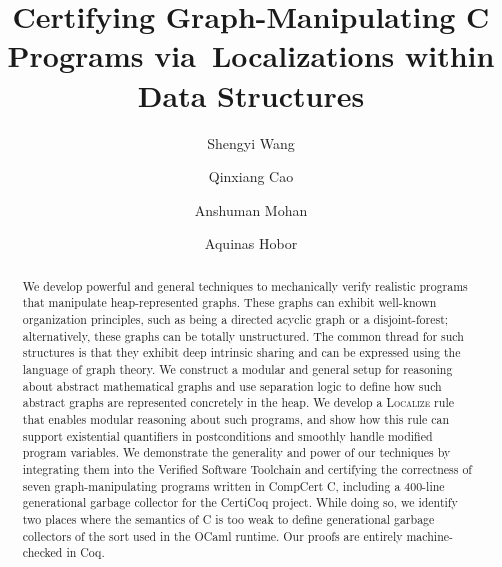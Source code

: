 \documentclass[acmsmall,screen]{acmart}
\newcommand\hide[1]{}
\newcommand{\infrulestyle}[1]{\textsc{#1}}
\begin{document}
\title[Certifying Graph-Manipulating Programs]
{Certifying Graph-Manipulating C Programs via~Localizations within Data Structures}





\author[S. Wang]{Shengyi Wang}


\author[Q. Cao]{Qinxiang Cao}


\author[A. Mohan]{Anshuman Mohan}


\author[A. Hobor]{Aquinas Hobor}



\hide{
\author{First2 Last2}
\authornote{with author2 note}          \orcid{nnnn-nnnn-nnnn-nnnn}             \affiliation{
  \position{Position2a}
  \department{Department2a}             \institution{Institution2a}           \streetaddress{Street2a Address2a}
  \city{City2a}
  \state{State2a}
  \postcode{Post-Code2a}
  \country{Country2a}                   }
\email{first2.last2@inst2a.com}         \affiliation{
  \position{Position2b}
  \department{Department2b}             \institution{Institution2b}           \streetaddress{Street3b Address2b}
  \city{City2b}
  \state{State2b}
  \postcode{Post-Code2b}
  \country{Country2b}                   }
\email{first2.last2@inst2b.org}         } 

\begin{abstract}
We develop powerful and general techniques to mechanically verify realistic programs that
manipulate heap-represented graphs.  These graphs can exhibit well-known organization 
principles, such as being a directed acyclic graph or a disjoint-forest; alternatively, these graphs can 
be totally unstructured.  The common thread for such structures is that they exhibit deep 
intrinsic sharing and can be expressed using the language of graph theory. 
We construct a modular and general setup for reasoning about abstract mathematical
graphs and use separation logic to define how such abstract graphs are represented concretely in
the heap. We develop a \infrulestyle{Localize} rule that enables modular reasoning
about such programs, and show how this rule can support existential
quantifiers in postconditions and smoothly handle modified program variables.
We demonstrate the generality and power of our techniques by integrating them into 
the Verified Software Toolchain and certifying the correctness of seven graph-manipulating 
programs written in CompCert C, including
a 400-line generational garbage collector for the CertiCoq project.
While doing so, we identify
two places where the semantics of C is too weak to define generational
garbage collectors of the
sort used in the OCaml runtime.  Our proofs are entirely machine-checked in Coq.
\end{abstract}
\end{document}
